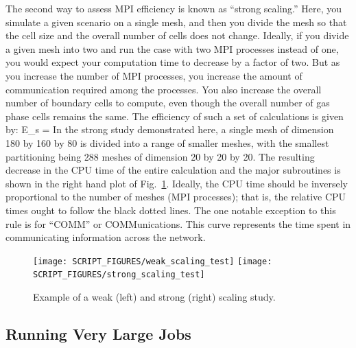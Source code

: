 \documentclass[11pt]{book}
\begin{document}
The second way to assess MPI efficiency is known as ``strong scaling.'' Here, you simulate a given scenario on a single mesh, and then you divide the mesh so that the cell size and the overall number of cells does not change. Ideally, if you divide a given mesh into two and run the case with two MPI processes instead of one, you would expect your computation time to decrease by a factor of two. But as you increase the number of MPI processes, you increase the amount of communication required among the processes. You also increase the overall number of boundary cells to compute, even though the overall number of gas phase cells remains the same. The efficiency of such a set of calculations is given by:
\be
   E_{\rm s} =  
\ee
In the strong study demonstrated here, a single mesh of dimension 180 by 160 by 80 is divided into a range of smaller meshes, with the smallest partitioning being 288 meshes of dimension 20 by 20 by 20. The resulting decrease in the CPU time of the entire calculation and the major subroutines is shown in the right hand plot of Fig.~\ref{fig:scaling_tests}. Ideally, the CPU time should be inversely proportional to the number of meshes (MPI processes); that is, the relative CPU times ought to follow the black dotted lines. The one notable exception to this rule is for ``COMM'' or COMMunications. This curve represents the time spent in communicating information across the network.
\begin{figure}[!ht]
\texttt{[image: SCRIPT\_FIGURES/weak\_scaling\_test]}
\texttt{[image: SCRIPT\_FIGURES/strong\_scaling\_test]}
\caption[MPI scaling study]{Example of a weak (left) and strong (right) scaling study.}
\label{fig:scaling_tests}
\end{figure}

\subsection{Running Very Large Jobs}
\end{document}
